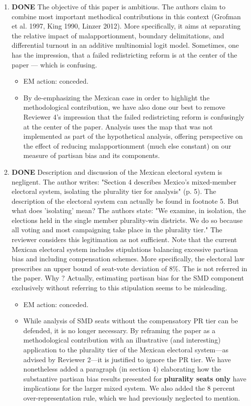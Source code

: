 \documentclass{article}
\begin{document}
\begin{enumerate}
\item {\bfseries\sffamily DONE} The objective of this paper is ambitious. The authors claim to combine most important methodical contributions in this context (Grofman et al. 1997, King 1990, Linzer 2012).  More specifically, it aims at separating the relative impact of malapportionment, boundary delimitations, and differential turnout in an additive multinomial logit model. Sometimes, one has the impression, that a failed redistricting reform is at the center of the paper --- which is confusing.
\label{sec:orgheadline22}
\begin{itemize}
\item EM action: conceded.
\item By de-emphasizing the Mexican case in order to highlight the methodological contribution, we have also done our best to remove Reviewer 4's impression that the failed redistricting reform is confusingly at the center of the paper. Analysis uses the map that was not implemented as part of the hypothetical analysis, offering perspective on the effect of reducing malapportionment (much else constant) on our measure of partisan bias and its components.
\end{itemize}
\item {\bfseries\sffamily DONE} Description and discussion of the Mexican electoral system is negligent. The author writes: "Section 4 describes Mexico's mixed-member electoral system, isolating the plurality tier for analysis" (p. 5). The description of the electoral system can actually be found in footnote 5. But  what does 'isolating' mean? The authors state: "We examine, in isolation, the elections held in the single member plurality-win districts. We do so because all voting and most campaigning take place in the plurality tier." The reviewer considers this legitimation as not sufficient. Note that the current Mexican electoral system includes stipulations balancing excessive partisan bias and including compensation schemes. More specifically, the electoral law prescribes an upper bound of seat-vote deviation of 8\%. The is not referred in the paper. Why ? Actually, estimating partisan bias for the SMD component exclusively without referring to this stipulation seems to be misleading.
\label{sec:orgheadline23}
\begin{itemize}
\item EM action: conceded.
\item While analysis of SMD seats without the compensatory PR tier can be defended, it is no longer necessary. By reframing the paper as a methodological contribution with an illustrative (and interesting) application to the plurality tier of the Mexican electoral system---as advised by Reviewer 2---it is justified to ignore the PR tier. We have nonetheless added a paragraph (in section 4) elaborating how the substantive partisan bias results presented for \textbf{plurality seats only} have implications for the larger mixed system. We also added the 8 percent over-representation rule, which we had previously neglected to mention.
\end{itemize}


\end{enumerate}
\end{document}
